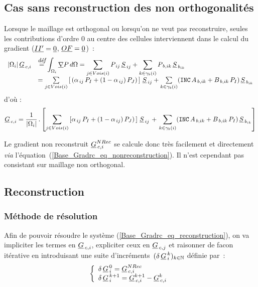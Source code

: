 \subsection*{\bf Cas sans reconstruction des non orthogonalit\'es}
Lorsque le maillage est orthogonal ou lorsqu'on ne veut pas reconstruire, seules
les contributions d'ordre $0$ au centre des cellules interviennent dans le
calcul du gradient ($\underline{II'} = \underline{0}$, $\underline{OF} = \underline{0}$)~:
\begin{equation}\notag
\begin{array}{ll}
|\Omega_i|\,\underline{G}_{\,c,i}&\overset{\text{\it\small d\'ef}}{=} \displaystyle\int_{\Omega_i}{\underline{\nabla}{P}\, d\Omega}
=\sum\limits_{j\in Vois(i)}P_{\,ij}\,{\underline{S}_{\,ij}} + \sum\limits_{k\in {\gamma_b(i)}} P_{\,b,ik}\,\underline{S}_{\,{b}_{ik}} \\
 &= \sum\limits_{j\in Vois(i)}\left[\,(\alpha_{\,ij}\,P_I +
(1 - \alpha_{\,ij})\,P_J)\,\right]\,{\underline{S}_{\,ij}}
+ \sum\limits_{k\in {\gamma_b(i)}} (\text{\texttt{INC}}\,A_{\,b,ik} + B_{\,b,ik}\,P_I )\,\underline{S}_{\,{b}_{ik}}\\
\end{array}
\end{equation}
d'o\`u :
\begin{multline}\label{Base_Gradrc_eq_nonreconstruction}
\underline{G}_{\,c,i}=\frac{1}{|\Omega_i|}\,.\left[\sum\limits_{j\in
Vois(i)}\left[\alpha_{\,ij}\,P_I + (1 - \alpha_{\,ij})\,P_J)\, \right]\,{\underline{S}_{\,ij}}\right.
+\left.\sum\limits_{k\in {\gamma_b(i)}}(\text{\texttt{INC}}\,A_{\,b,ik} + B_{\,b,ik}\,P_I
)\,\underline{S}_{\,{b}_{ik}} \right]
\end{multline}

Le gradient non reconstruit $ \underline{G}_{\,c,i}^{NRec} $ se calcule donc tr\`es
facilement et directement {\it via} l'\'equation~(\ref{Base_Gradrc_eq_nonreconstruction}).
Il n'est cependant pas consistant sur maillage non orthogonal.

\subsection*{\bf Reconstruction}
\subsubsection*{\bf M\'ethode de r\'esolution}

Afin de pouvoir r\'esoudre le syst\`eme (\ref{Base_Gradrc_eq_reconstruction}), on va
impliciter les termes en $\underline{G}_{\,c,i}$, expliciter ceux en
$\underline{G}_{\,c,j}$ et raisonner de facon it\'erative en introduisant une suite
d'incr\'ements~$(\delta\,\underline{G}^{\,k}_{\,i})_{k\in \mathbb{N}}$ d\'efinie par~:\\
\begin{equation}
\left\{\begin{array}{l}
\delta\,\underline{G}^{\,0}_{\,i} = \underline{G}_{\,c,i}^{NRec}\\
\delta\,\underline{G}^{\,k+1}_{\,i} = \underline{G}^{k+1}_{\,c,i}-\underline{G}^k_{\,c,i}  \end{array}\right.
\end{equation}

